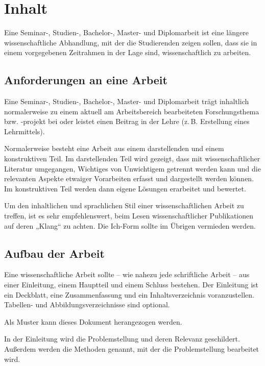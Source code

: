 \documentclass[
    12pt,
    headings=small,
    parskip=half,           %
    bibliography=totoc,
    numbers=noenddot,       %
    open=any,               %
    ]{scrreprt}
\begin{document}
\chapter{Inhalt}

Eine Seminar-, Studien-, Bachelor-, Master- und Diplomarbeit ist eine längere wissenschaftliche Abhandlung, mit der die Studierenden zeigen sollen, dass sie in einem vorgegebenen Zeitrahmen in der Lage sind, wissenschaftlich zu arbeiten.

\section{Anforderungen an eine Arbeit}

Eine Seminar-, Studien-, Bachelor-, Master- und Diplomarbeit trägt inhaltlich normalerweise zu einem aktuell am Arbeitsbereich bearbeiteten Forschungsthema bzw. -projekt bei oder leistet einen Beitrag in der Lehre (z.\,B. Erstellung eines Lehrmittels).

Normalerweise besteht eine Arbeit aus einem darstellenden und einem konstruktiven Teil. Im darstellenden Teil wird gezeigt, dass mit wissenschaftlicher Literatur umgegangen, Wichtiges von Unwichtigem getrennt werden kann und die relevanten Aspekte etwaiger Vorarbeiten erfasst und dargestellt werden können. Im konstruktiven Teil werden dann eigene Lösungen erarbeitet und bewertet.

Um den inhaltlichen und sprachlichen Stil einer wissenschaftlichen Arbeit zu treffen, ist es sehr empfehlenswert, beim Lesen wissenschaftlicher Publikationen auf deren „Klang“ \cite{Tolk2003} zu achten. Die Ich-Form sollte im Übrigen vermieden werden.

\section{Aufbau der Arbeit}

Eine wissenschaftliche Arbeit sollte -- wie nahezu jede schriftliche Arbeit -- aus einer Einleitung, einem Hauptteil und einem Schluss bestehen. Der Einleitung ist ein Deckblatt, eine Zusammenfassung und ein Inhaltsverzeichnis voranzustellen. Tabellen- und Abbildungsverzeichnisse sind optional.

Als Muster kann dieses Dokument herangezogen werden.

In der Einleitung wird die Problemstellung und deren Relevanz geschildert. Außerdem werden die Methoden genannt, mit der die Problemstellung bearbeitet wird.
\end{document}

